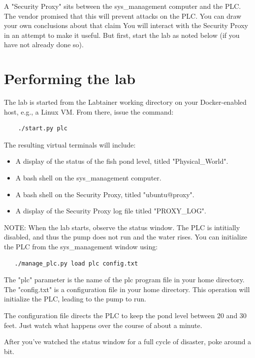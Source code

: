 \documentclass{article}
\begin{document}
A "Security Proxy" sits between the sys\_management computer and the PLC.  The vendor promised
that this will prevent attacks on the PLC.  You can draw your own conclusions about that claim
You will interact with the Security Proxy in an attempt to make it useful.  But first, start the lab
as noted below (if you have not already done so).

\section {Performing the lab}
The lab is started from the Labtainer working
directory on your Docker-enabled host, e.g., a Linux VM.
From there, issue the command:
\begin{verbatim}
    ./start.py plc
\end{verbatim}
\noindent The resulting virtual terminals will include: 
\begin{itemize}
\item A display of the status of the fish pond level, titled "Physical\_World".
\item A bash shell on the sys\_management computer.
\item A bash shell on the Security Proxy, titled "ubuntu@proxy".
\item A display of the Security Proxy log file titled "PROXY\_LOG".
\end{itemize}
NOTE: When the lab starts, observe the status window. The PLC is intitially
disabled, and thus the pump does not run and the water rises.  
You can initialize the PLC from the sys\_management window using:
\begin{verbatim}
   ./manage_plc.py load plc config.txt
\end{verbatim}

\noindent The "plc" parameter is the name of the plc program file in your home directory.
The "config.txt" is a configuration file in your home directory.  This operation
will initialize the PLC, leading to the pump to run.

The configuration file directs the PLC to keep the pond level between 20 and 30 feet.
Just watch what happens over the course of about a minute.

After you've watched the status window for a full cycle of disaster, 
poke around a bit.  

\renewcommand\thesubsubsection{}
\end{document}
